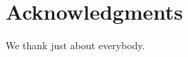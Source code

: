 \documentclass[10pt,letterpaper]{article}
\begin{document}
\section*{Acknowledgments}
We thank just about everybody.

\nolinenumbers




\end{document}
